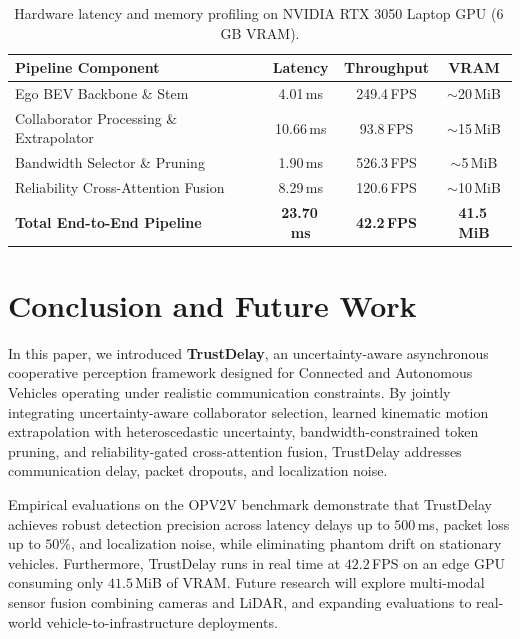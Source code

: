 \documentclass[10pt,journal,compsoc]{IEEEtran}
\begin{document}
\begin{table}[t]
\caption{Hardware latency and memory profiling on NVIDIA RTX 3050 Laptop GPU (6\,GB VRAM).}
\label{tab:hardware_profiling}
\centering
\begin{tabular}{lccc}
\hline\hline
\textbf{Pipeline Component} & \textbf{Latency} & \textbf{Throughput} & \textbf{VRAM} \\
\hline
Ego BEV Backbone \& Stem & 4.01\,ms & 249.4\,FPS & $\sim$20\,MiB \\
Collaborator Processing \& Extrapolator & 10.66\,ms & 93.8\,FPS & $\sim$15\,MiB \\
Bandwidth Selector \& Pruning & 1.90\,ms & 526.3\,FPS & $\sim$5\,MiB \\
Reliability Cross-Attention Fusion & 8.29\,ms & 120.6\,FPS & $\sim$10\,MiB \\
\hline
\textbf{Total End-to-End Pipeline} & \textbf{23.70\,ms} & \textbf{42.2\,FPS} & \textbf{41.5\,MiB} \\
\hline\hline
\end{tabular}
\end{table}

\section{Conclusion and Future Work}
In this paper, we introduced \textbf{TrustDelay}, an uncertainty-aware asynchronous cooperative perception framework designed for Connected and Autonomous Vehicles operating under realistic communication constraints. By jointly integrating uncertainty-aware collaborator selection, learned kinematic motion extrapolation with heteroscedastic uncertainty, bandwidth-constrained token pruning, and reliability-gated cross-attention fusion, TrustDelay addresses communication delay, packet dropouts, and localization noise. 

Empirical evaluations on the OPV2V benchmark demonstrate that TrustDelay achieves robust detection precision across latency delays up to $500$\,ms, packet loss up to $50\%$, and localization noise, while eliminating phantom drift on stationary vehicles. Furthermore, TrustDelay runs in real time at $42.2$\,FPS on an edge GPU consuming only $41.5$\,MiB of VRAM. Future research will explore multi-modal sensor fusion combining cameras and LiDAR, and expanding evaluations to real-world vehicle-to-infrastructure deployments.
\end{document}
